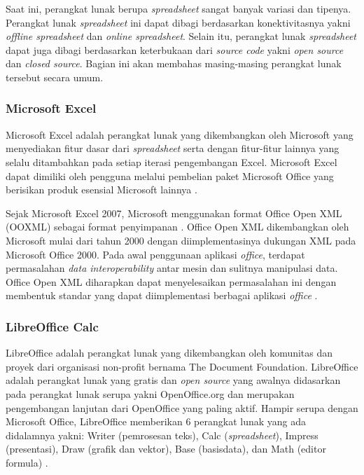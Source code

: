 Saat ini, perangkat lunak berupa \textit{spreadsheet} sangat banyak variasi dan tipenya. Perangkat lunak \textit{spreadsheet} ini dapat dibagi berdasarkan konektivitasnya yakni \textit{offline spreadsheet} dan \textit{online spreadsheet}. Selain itu, perangkat lunak \textit{spreadsheet} dapat juga dibagi berdasarkan keterbukaan dari \textit{source code} yakni \textit{open source} dan \textit{closed source}. Bagian ini akan membahas masing-masing perangkat lunak tersebut secara umum.

    \subsubsection{Microsoft Excel}
    Microsoft Excel adalah perangkat lunak yang dikembangkan oleh Microsoft yang menyediakan fitur dasar dari \textit{spreadsheet} serta dengan fitur-fitur lainnya yang selalu ditambahkan pada setiap iterasi pengembangan Excel. Microsoft Excel dapat dimiliki oleh pengguna melalui pembelian paket Microsoft Office yang berisikan produk esensial Microsoft lainnya \parencite{MSExcelProduct}. 

    Sejak Microsoft Excel 2007, Microsoft menggunakan format Office Open XML (OOXML) sebagai format penyimpanan \parencite{MSExcelSupport}. Office Open XML dikembangkan oleh Microsoft mulai dari tahun 2000 dengan diimplementasinya dukungan XML pada Microsoft Office 2000. Pada awal penggunaan aplikasi \textit{office}, terdapat permasalahan \textit{data interoperability} antar mesin dan sulitnya manipulasi data. Office Open XML diharapkan dapat menyelesaikan permasalahan ini dengan membentuk standar yang dapat diimplementasi berbagai aplikasi \textit{office} \parencite{OOXMLFormat}.

    \subsubsection{LibreOffice Calc}
    LibreOffice adalah perangkat lunak yang dikembangkan oleh komunitas dan proyek dari organisasi non-profit bernama The Document Foundation. LibreOffice adalah perangkat lunak yang gratis dan \textit{open source} yang awalnya didasarkan pada perangkat lunak serupa yakni OpenOffice.org dan merupakan pengembangan lanjutan dari OpenOffice yang paling aktif. Hampir serupa dengan Microsoft Office, LibreOffice memberikan 6 perangkat lunak yang ada didalamnya yakni: Writer (pemrosesan teks), Calc (\textit{spreadsheet}), Impress (presentasi), Draw (grafik dan vektor), Base (basisdata), dan Math (editor formula) \parencite{LibreOffice}. 

